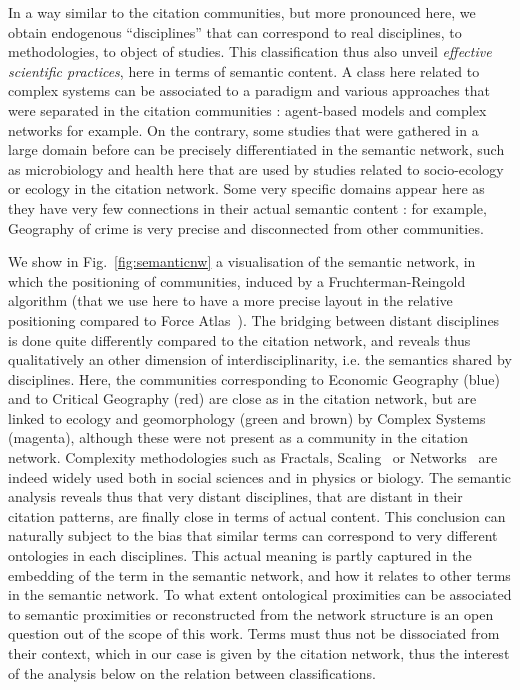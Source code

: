 In a way similar to the citation communities, but more pronounced here, we obtain endogenous ``disciplines'' that can correspond to real disciplines, to methodologies, to object of studies. This classification thus also unveil \emph{effective scientific practices}, here in terms of semantic content. A class here related to complex systems can be associated to a paradigm and various approaches that were separated in the citation communities : agent-based models and complex networks for example. On the contrary, some studies that were gathered in a large domain before can be precisely differentiated in the semantic network, such as microbiology and health here that are used by studies related to socio-ecology or ecology in the citation network. Some very specific domains appear here as they have very few connections in their actual semantic content : for example, Geography of crime is very precise and disconnected from other communities.


We show in Fig.~\ref{fig:semanticnw} a visualisation of the semantic network, in which the positioning of communities, induced by a Fruchterman-Reingold algorithm (that we use here to have a more precise layout in the relative positioning compared to Force Atlas~\citep{jacomy2014forceatlas2}). The bridging between distant disciplines is done quite differently compared to the citation network, and reveals thus qualitatively an other dimension of interdisciplinarity, i.e. the semantics shared by disciplines. Here, the communities corresponding to Economic Geography (blue) and to Critical Geography (red) are close as in the citation network, but are linked to ecology and geomorphology (green and brown) by Complex Systems (magenta), although these were not present as a community in the citation network. Complexity methodologies such as Fractals, Scaling~\citep{west2017scale} or Networks~\citep{newman2003structure} are indeed widely used both in social sciences and in physics or biology. The semantic analysis reveals thus that very distant disciplines, that are distant in their citation patterns, are finally close in terms of actual content. This conclusion can naturally subject to the bias that similar terms can correspond to very different ontologies in each disciplines. This actual meaning is partly captured in the embedding of the term in the semantic network, and how it relates to other terms in the semantic network. To what extent ontological proximities can be associated to semantic proximities or reconstructed from the network structure is an open question out of the scope of this work. Terms must thus not be dissociated from their context, which in our case is given by the citation network, thus the interest of the analysis below on the relation between classifications.



